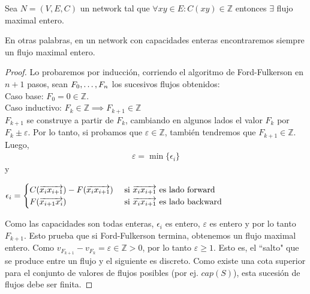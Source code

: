 \begin{theorem}\label{integrality}
  Sea $N=(V,E,C)$ un network tal que $\forall xy \in E : C(xy) \in \mathbb{Z}$ entonces $\exists$ flujo maximal entero.
  
  En otras palabras, en un network con capacidades enteras encontraremos siempre un flujo maximal entero.
\end{theorem}

\begin{proof}
  Lo probaremos por inducción, corriendo el algoritmo de Ford-Fulkerson en $n+1$ pasos, sean $F_0, \mathellipsis, F_n$ los sucesivos flujos obtenidos:\\
  Caso base: $F_0 = 0 \in \mathbb{Z}$.\\
  Caso inductivo:
  $F_k \in \mathbb{Z} \implies F_{k+1} \in \mathbb{Z}$\\
  $F_{k+1}$ se construye a partir de $F_k$, cambiando en algunos lados el valor $F_k$ por $F_k \pm \varepsilon$. Por lo tanto, si probamos que $\varepsilon \in \mathbb{Z}$, también tendremos que $F_{k+1} \in \mathbb{Z}$. Luego,
  \begin{align}
    \varepsilon = \min\{\epsilon_i\}
  \end{align}
  y \begin{center}
    $\epsilon_i = \begin{cases} C(\overrightarrow{x_i x_{i+1}}) - F(\overrightarrow{x_i x_{i+1}}) & \text{ si } \overrightarrow{x_i x_{i+1}} \text{ es lado forward}\\
      F(\overrightarrow{x_{i+1} x_i}) & \text{ si } \overrightarrow{x_i x_{i+1}} \text{ es lado backward}
    \end{cases}$
  \end{center}
  Como las capacidades son todas enteras, $\epsilon_i$ es entero, $\varepsilon$  es entero y por lo tanto $F_{k+1}$.
  Esto prueba que si Ford-Fulkerson termina, obtenemos un flujo maximal entero.
  Como $v_{F_{k+1}} - v_{F_k} = \varepsilon \in \mathbb{Z} > 0$, por lo tanto $\varepsilon \ge 1$. Esto es, el ``salto" que se produce entre un flujo y el siguiente es discreto.
  Como existe una cota superior para el conjunto de valores de flujos posibles (por ej. $cap(S)$), esta sucesión de flujos debe ser finita. 
\end{proof}

